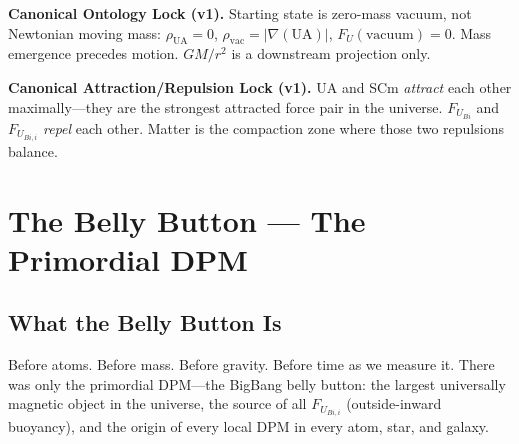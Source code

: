 \documentclass[12pt,a4paper]{article}
\begin{document}
\begin{center}
\end{center}

\noindent\textbf{Canonical Ontology Lock (v1).}
Starting state is zero-mass vacuum, not Newtonian moving mass:
$\rho_\text{UA}=0$, $\rho_\text{vac}=|\nabla(\text{UA})|$, $F_U(\text{vacuum})=0$.
Mass emergence precedes motion.  $GM/r^2$ is a downstream projection only.

\noindent\textbf{Canonical Attraction/Repulsion Lock (v1).}
UA and SCm \emph{attract} each other maximally---they are the strongest attracted
force pair in the universe.  $F_{U_{Bi}}$ and $F_{U_{Bi,i}}$ \emph{repel} each
other.  Matter is the compaction zone where those two repulsions balance.

\section{The Belly Button --- The Primordial DPM}
\label{sec:belly_button}

\subsection{What the Belly Button Is}

Before atoms.  Before mass.  Before gravity.  Before time as we measure it.
There was only the primordial DPM---the BigBang belly button: the largest
universally magnetic object in the universe, the source of all $F_{U_{Bi,i}}$
(outside-inward buoyancy), and the origin of every local DPM in every atom,
star, and galaxy.
\end{document}
